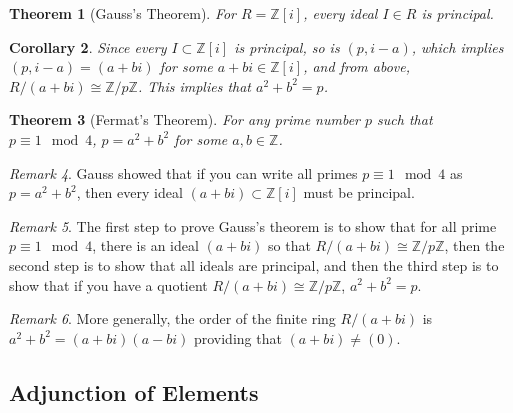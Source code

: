 \documentclass[12pt]{article}
\newtheorem{thm}{Theorem}[section]
\newtheorem{cor}[thm]{Corollary}
\theoremstyle{definition}
\theoremstyle{remark}
\newtheorem{rmk}[thm]{Remark}
\numberwithin{equation}{section}
\newcommand\Z{\mathbb Z}    %
\begin{document}
\vspace{15pt}

\begin{thm}[Gauss's Theorem]
        For $R = \Z[i]$, every ideal $I \in R$ is principal.
\end{thm}


\vspace{15pt}

\begin{cor}
        Since every $I \subset \Z[i]$ is principal, so is $(p,i-a)$, which implies $(p,i-a) = (a+bi)$ for some $a+bi \in \Z[i]$, and from above, $R/(a+bi) \cong \Z/p\Z$. This implies that $a^2+b^2 = p$.
\end{cor}

\vspace{15pt}

\begin{thm}[Fermat's Theorem]
        For any prime number $p$ such that $p \equiv 1 \mod 4$, $p = a^2 + b^2$ for some $a,b \in \Z$.
\end{thm}


\vspace{15pt}

\begin{rmk}
        Gauss showed that if you can write all primes $p\equiv 1 \mod 4$ as $p = a^2 +b^2$, then every ideal $(a+bi) \subset \Z[i]$ must be principal.
\end{rmk}


\vspace{15pt}

\begin{rmk}
        The first step to prove Gauss's theorem is to show that for all prime $p\equiv 1 \mod 4$, there is an ideal $(a+bi)$ so that $R/(a+bi) \cong \Z/p\Z$, then the second step is to show that all ideals are principal, and then the third step is to show that if you have a quotient $R/(a+bi) \cong \Z/p\Z$, $a^2+b^2 = p$.
\end{rmk}

\vspace{15pt}


\begin{rmk}
        More generally, the order of the finite ring $R/(a+bi)$ is $a^2+b^2 = (a+bi)(a-bi)$ providing that $(a+bi) \neq (0)$.
\end{rmk}


\vspace{15pt}



\subsection{Adjunction of Elements}
\end{document}
